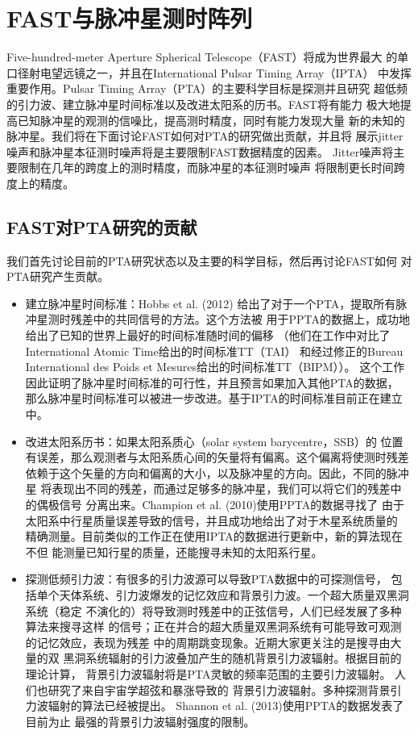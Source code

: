 \section{FAST与脉冲星测时阵列}

Five-hundred-meter Aperture Spherical Telescope（FAST）将成为世界最大
的单口径射电望远镜之一，并且在International Pulsar Timing Array（IPTA）
中发挥重要作用。Pulsar Timing Array（PTA）的主要科学目标是探测并且研究
超低频的引力波、建立脉冲星时间标准以及改进太阳系的历书。FAST将有能力
极大地提高已知脉冲星的观测的信噪比，提高测时精度，同时有能力发现大量
新的未知的脉冲星。我们将在下面讨论FAST如何对PTA的研究做出贡献，并且将
展示jitter噪声和脉冲星本征测时噪声将是主要限制FAST数据精度的因素。
Jitter噪声将主要限制在几年的跨度上的测时精度，而脉冲星的本征测时噪声
将限制更长时间跨度上的精度。

\subsection{FAST对PTA研究的贡献}

我们首先讨论目前的PTA研究状态以及主要的科学目标，然后再讨论FAST如何
对PTA研究产生贡献。

\begin{itemize}
\item 建立脉冲星时间标准：Hobbs et al. (2012)\supercite{hcm+12} 
给出了对于一个PTA，提取所有脉冲星测时残差中的共同信号的方法。这个方法被
用于PPTA的数据上，成功地给出了已知的世界上最好的时间标准随时间的偏移
（他们在工作中对比了International Atomic Time给出的时间标准TT（TAI）
和经过修正的Bureau International des Poids et Mesures给出的时间标准TT（BIPM））。
这个工作因此证明了脉冲星时间标准的可行性，并且预言如果加入其他PTA的数据，
那么脉冲星时间标准可以被进一步改进。基于IPTA的时间标准目前正在建立中。
\item 改进太阳系历书：如果太阳系质心（solar system barycentre，SSB）的
位置有误差，那么观测者与太阳系质心间的矢量将有偏离。这个偏离将使测时残差
依赖于这个矢量的方向和偏离的大小，以及脉冲星的方向。因此，不同的脉冲星
将表现出不同的残差，而通过足够多的脉冲星，我们可以将它们的残差中的偶极信号
分离出来。Champion et al. (2010)\supercite{chm+10}使用PPTA的数据寻找了
由于太阳系中行星质量误差导致的信号，并且成功地给出了对于木星系统质量的
精确测量。目前类似的工作正在使用IPTA的数据进行更新中，新的算法现在不但
能测量已知行星的质量，还能搜寻未知的太阳系行星。
\item 探测低频引力波：有很多的引力波源可以导致PTA数据中的可探测信号，
包括单个天体系统、引力波爆发的记忆效应和背景引力波。一个超大质量双黑洞系统（稳定
不演化的）将导致测时残差中的正弦信号，人们已经发展了多种算法来搜寻这样
的信号；正在并合的超大质量双黑洞系统有可能导致可观测的记忆效应，表现为残差
中的周期跳变现象\supercite{Wang15}。近期大家更关注的是搜寻由大量的双
黑洞系统辐射的引力波叠加产生的随机背景引力波辐射。根据目前的理论计算，
背景引力波辐射将是PTA灵敏的频率范围的主要引力波辐射\supercite{rwh+12}。
人们也研究了来自宇宙学超弦\supercite{oms10}和暴涨\supercite{tzz+14}导致的
背景引力波辐射。多种探测背景引力波辐射的算法已经被提出\supercite{jhv+06,ych+11,vlj+11,dfg+13}。
Shannon et al. (2013)\supercite{Shannon13b}使用PPTA的数据发表了目前为止
最强的背景引力波辐射强度的限制。
\end{itemize}

